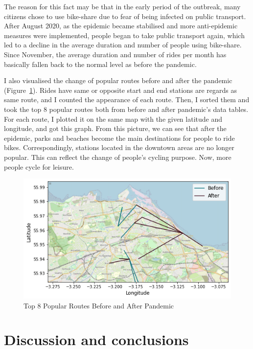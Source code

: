 \documentclass[11pt,a4paper]{article}
\begin{document}
The reason for this fact may be that in the early period of the outbreak, many citizens chose to use bike-share due to fear of being infected on public transport. After August 2020, as the epidemic became stabilised and more anti-epidemic measures were implemented, people began to take public transport again, which led to a decline in the average duration and number of people using bike-share. Since November, the average duration and number of rides per month has basically fallen back to the normal level as before the pandemic.

I also visualised the change of popular routes before and after the pandemic (Figure~\ref{fds-project-template:fig:mapFigure}). Rides have same or opposite start and end stations are regards as same route, and I counted the appearance of each route. Then, I sorted them and took the top 8 popular routes both from before and after pandemic’s data tables. For each route, I plotted it on the same map with the given latitude and longitude, and got this graph. From this picture, we can see that after the epidemic, parks and beaches become the main destinations for people to ride bikes. Correspondingly, stations located in the downtown areas are no longer popular. This can reflect the change of people's cycling purpose. Now, more people cycle for leisure.

\begin{figure}[ht!]
  \centering
  \includegraphics[scale=0.85]{report/mapFigure.png}
  \caption{Top 8 Popular Routes Before and After Pandemic}
  \label{fds-project-template:fig:mapFigure}
\end{figure}

\section{Discussion and conclusions}
\end{document}
